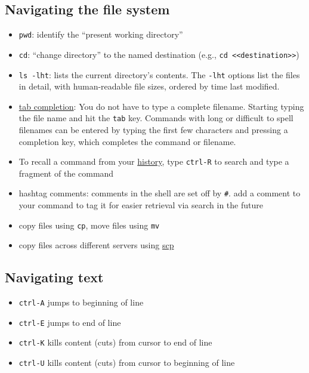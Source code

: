 \subsection{Navigating the file system}

\begin{itemize}
	\item \texttt{pwd}: identify the ``present working directory''
	\item \texttt{cd}: ``change directory'' to the named destination (e.g., \texttt{cd <<destination>>})
	\item \texttt{ls -lht}: lists the current directory's contents. The \texttt{-lht} options list the files in detail, with human-readable file sizes, ordered by time last modified.
	\item \href{https://en.wikipedia.org/wiki/Command-line_completion}{tab completion}:
	You do not have to type a complete filename. Starting typing the file name and hit the \texttt{tab} key.
	Commands with long or difficult to spell filenames can be entered by typing the first few characters and pressing a completion key, which completes the command or filename.
	\item To recall a command from your \href{https://www.howtogeek.com/howto/44997/how-to-use-bash-history-to-improve-your-command-line-productivity/}{history}, type \texttt{ctrl-R} to search and type a fragment of the command
	\item hashtag comments: comments in the shell are set off by \texttt{\#}. add a comment to your command to tag it for easier retrieval via search in the future
	\item copy files using \texttt{cp}, move files using \texttt{mv}
	\item copy files across different servers using \href{https://kb.iu.edu/d/agye}{scp}
\end{itemize}

\subsection{Navigating text}

\begin{itemize}
	\item \texttt{ctrl-A} jumps to beginning of line
	\item \texttt{ctrl-E} jumps to end of line
	\item \texttt{ctrl-K} kills content (cuts) from cursor to end of line
	\item \texttt{ctrl-U} kills content (cuts) from cursor to beginning of line
\end{itemize}

